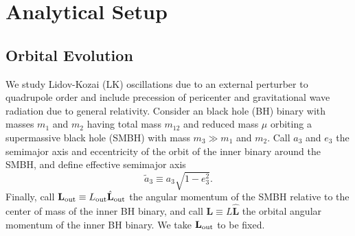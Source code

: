 \documentclass[
        twocolumn,
        twocolappendix
    ]{aastex63}
\renewcommand*{\bm}[1]{\boldsymbol{\mathbf{#1}}}
\newcommand*{\uv}[1]{\hat{\bm{#1}}}
\begin{document}
\section{Analytical Setup}\label{s:setup}

\subsection{Orbital Evolution}

We study Lidov-Kozai (LK) oscillations due to an external perturber to
quadrupole order and include precession of pericenter and gravitational wave
radiation due to general relativity. Consider an black hole (BH) binary
with masses $m_1$ and $m_2$ having total mass $m_{12}$ and reduced mass $\mu$
orbiting a supermassive black hole (SMBH) with mass $m_3 \gg m_1$ and $m_2$.
Call $a_3$ and $e_3$ the semimajor axis and eccentricity of the orbit of the
inner binary around the SMBH, and define effective semimajor axis
\begin{equation}
    \tilde{a}_3 \equiv a_3\sqrt{1 - e_3^2}.
\end{equation}
Finally, call $\bm{L}_{\rm out} \equiv L_{\rm out} \uv{L}_{\rm out}$ the angular
momentum of the SMBH relative to the center of mass of the inner BH binary, and
call $\bm{L} \equiv L \uv{L}$ the orbital angular momentum of the inner BH
binary. We take $\bm{L}_{\rm out}$ to be fixed.
\end{document}
